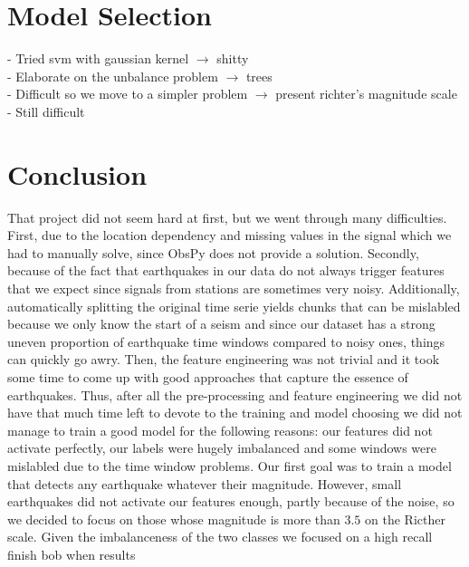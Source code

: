 \documentclass[10pt,conference,compsocconf]{IEEEtran}
\begin{document}
\section{Model Selection}
- Tried svm with gaussian kernel $\rightarrow$ shitty\\
- Elaborate on the unbalance problem $\rightarrow$ trees\\
- Difficult so we move to a simpler problem $\rightarrow$ present richter's magnitude scale\\
- Still difficult\\

\section{Conclusion}
That project did not seem hard at first, but we went through many difficulties. First, due to the location dependency and missing values in the signal which we had to manually solve, since ObsPy does not provide a solution. Secondly, because of the fact that earthquakes in our data do not always trigger features that we expect since signals from stations are sometimes very noisy. Additionally, automatically splitting the original time serie yields chunks that can be mislabled because we only know the start of a seism and since our dataset has a strong uneven proportion of earthquake time windows compared to noisy ones, things can quickly go awry. Then, the feature engineering was not trivial and it took some time to come up with good approaches that capture the essence of earthquakes.\newline
Thus, after all the pre-processing and feature engineering we did not have that much time left to devote to the training and model choosing we did not manage to train a good model for the following reasons: our features did not activate perfectly, our labels were hugely imbalanced and some windows were mislabled due to the time window problems. Our first goal was to train a model that detects any earthquake whatever their magnitude. However, small earthquakes did not activate our features enough, partly because of the noise, so we decided to focus on those whose magnitude is more than $3.5$ on the Ricther scale. Given the imbalanceness of the two classes we focused on a high recall finish bob when results \newline
\end{document}
